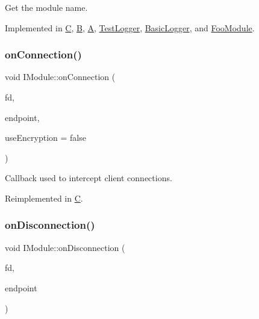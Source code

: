 Get the module name. 



Implemented in \mbox{\hyperlink{class_c_ad5f4b90909e9c14fc2601adc54ffdfa6}{C}}, \mbox{\hyperlink{class_b_ae304625cf30ffd9574cc71682558cf2e}{B}}, \mbox{\hyperlink{class_a_a2d19f0df2a97d6c3ad2c763f9134af82}{A}}, \mbox{\hyperlink{class_test_logger_a4e3ad3222ab7495cf30bb5b1a5270795}{Test\+Logger}}, \mbox{\hyperlink{class_basic_logger_a832838fa70c5910babd911b767a5f6f7}{Basic\+Logger}}, and \mbox{\hyperlink{class_foo_module_ac71d5e6de92ab9c804cc708528f052d2}{Foo\+Module}}.

\mbox{\label{classo_z_1_1_i_module_a8acf56655f9e59a8a04afd8b0adf79d6}} 
\subsubsection{\texorpdfstring{onConnection()}{onConnection()}}
{\footnotesize\ttfamily void I\+Module\+::on\+Connection (\begin{DoxyParamCaption}\item[{const \mbox{\hyperlink{namespaceo_z_acbb8d05709257b6414b3979597f88c0c}{File\+Descriptor}}}]{fd,  }\item[{const \mbox{\hyperlink{classo_z_1_1_endpoint}{Endpoint}}}]{endpoint,  }\item[{bool}]{use\+Encryption = {\ttfamily false} }\end{DoxyParamCaption})\hspace{0.3cm}{\ttfamily [virtual]}}



Callback used to intercept client connections. 



Reimplemented in \mbox{\hyperlink{class_c_a9d2de0b00320ee2011d7e326346d00cb}{C}}.

\mbox{\label{classo_z_1_1_i_module_aa178220a4e7ba0cca50a131403e04847}} 
\subsubsection{\texorpdfstring{onDisconnection()}{onDisconnection()}}
{\footnotesize\ttfamily void I\+Module\+::on\+Disconnection (\begin{DoxyParamCaption}\item[{const \mbox{\hyperlink{namespaceo_z_acbb8d05709257b6414b3979597f88c0c}{File\+Descriptor}}}]{fd,  }\item[{const \mbox{\hyperlink{classo_z_1_1_endpoint}{Endpoint}}}]{endpoint }\end{DoxyParamCaption})\hspace{0.3cm}{\ttfamily [virtual]}}



